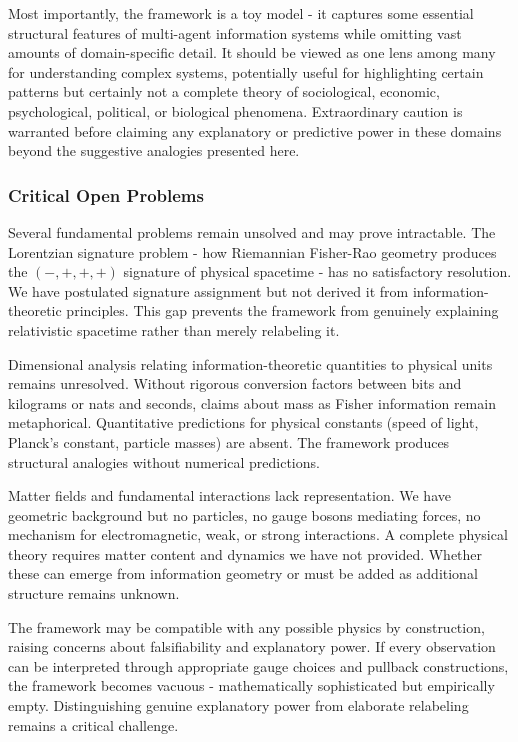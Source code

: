 \documentclass[11pt]{article}
\begin{document}
Most importantly, the framework is a toy model - it captures some essential structural features of multi-agent information systems while omitting vast amounts of domain-specific detail. It should be viewed as one lens among many for understanding complex systems, potentially useful for highlighting certain patterns but certainly not a complete theory of sociological, economic, psychological, political, or biological phenomena. Extraordinary caution is warranted before claiming any explanatory or predictive power in these domains beyond the suggestive analogies presented here.







\subsubsection{Critical Open Problems}

Several fundamental problems remain unsolved and may prove intractable. The Lorentzian signature problem - how Riemannian Fisher-Rao geometry produces the $(-,+,+,+)$ signature of physical spacetime - has no satisfactory resolution. We have postulated signature assignment but not derived it from information-theoretic principles. This gap prevents the framework from genuinely explaining relativistic spacetime rather than merely relabeling it.

Dimensional analysis relating information-theoretic quantities to physical units remains unresolved. Without rigorous conversion factors between bits and kilograms or nats and seconds, claims about mass as Fisher information remain metaphorical. Quantitative predictions for physical constants (speed of light, Planck's constant, particle masses) are absent. The framework produces structural analogies without numerical predictions.

Matter fields and fundamental interactions lack representation. We have geometric background but no particles, no gauge bosons mediating forces, no mechanism for electromagnetic, weak, or strong interactions. A complete physical theory requires matter content and dynamics we have not provided. Whether these can emerge from information geometry or must be added as additional structure remains unknown.

The framework may be compatible with any possible physics by construction, raising concerns about falsifiability and explanatory power. If every observation can be interpreted through appropriate gauge choices and pullback constructions, the framework becomes vacuous - mathematically sophisticated but empirically empty. Distinguishing genuine explanatory power from elaborate relabeling remains a critical challenge.
\end{document}
